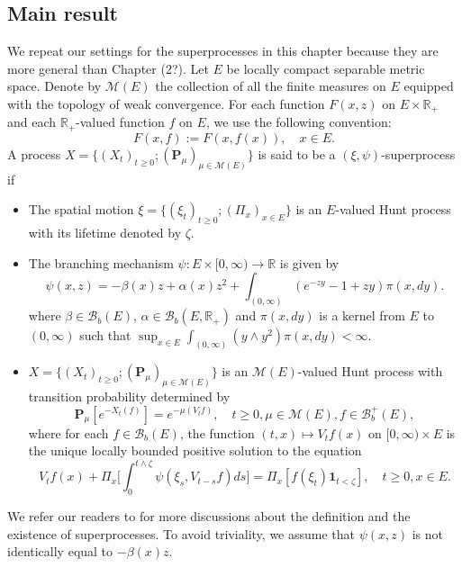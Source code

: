 \subsection{Main result}
	
	We repeat our settings for the superprocesses in this chapter because they are more general than Chapter (2?).
    Let $E$ be locally compact separable metric space. Denote by $\mathcal M(E)$ the collection of all the finite measures on $E$ equipped with the topology of weak convergence.
    For each function $F(x,z)$ on $E\times \mathbb R_+$ and each $\mathbb R_+$-valued function $f$ on $E$, we use the following convention:
\[
    F(x,f):= F(x,f(x)),\quad x\in E.
\]
    A process $X=\{(X_t)_{t\geq 0}; (\mathbf P_\mu)_{\mu \in \mathcal M(E)}\}$ is said to be a $(\xi,\psi)$-superprocess if
\begin{itemize}
\item
    The spatial motion $\xi=\{(\xi_t)_{t\geq 0};(\Pi_x)_{x\in E}\}$ is an $E$-valued Hunt process with its lifetime denoted by $\zeta$.
\item
    The branching mechanism $\psi: E\times[0,\infty) \to \mathbb R$ is given by
\begin{equation}
\label{eq: branching mechanism}
    \psi(x,z)=
    -\beta(x) z + \alpha (x) z^2 + \int_{(0,\infty)} (e^{-zy} - 1 + zy) \pi(x,dy).
\end{equation}
    where $\beta \in \mathcal B_b(E)$, $\alpha \in \mathcal B_b(E, \mathbb R_+)$ and $\pi(x,dy)$ is a kernel from $E$ to $(0,\infty)$ such that $\sup_{x\in E} \int_{(0,\infty)} (y\wedge y^2) \pi(x,dy) < \infty$.
\item
    $X=\{(X_t)_{t\geq 0}; (\mathbf P_\mu)_{\mu \in \mathcal M(E)}\}$ is an $\mathcal M(E)$-valued Hunt process with transition probability determined by
\begin{equation}
    \mathbf P_\mu [e^{-X_t(f)}] = e^{-\mu(V_tf)},
    \quad t\geq 0, \mu \in \mathcal M(E), f\in \mathcal B^+_b(E),
\end{equation}
    where for each $f\in \mathcal B_b(E)$, the function $(t,x)\mapsto V_tf(x)$ on $[0,\infty) \times E$ is the unique locally bounded positive solution to the equation
\begin{equation}\label{eq:FKPP_in_definition}
    V_tf(x) + \Pi_x \Big[  \int_0^{t\wedge \zeta} \psi(\xi_s,V_{t-s}f)ds \Big]
    = \Pi_x [ f(\xi_t)\mathbf 1_{t<\zeta} ],
    \quad t \geq 0, x \in E.
\end{equation}
\end{itemize}
    We refer our readers to \cite{Li2011Measure-valued} for more discussions about the definition and the existence of superprocesses.
    To avoid triviality, we assume that
    $\psi(x,z)$ is not identically equal to $-\beta(x)z$.

